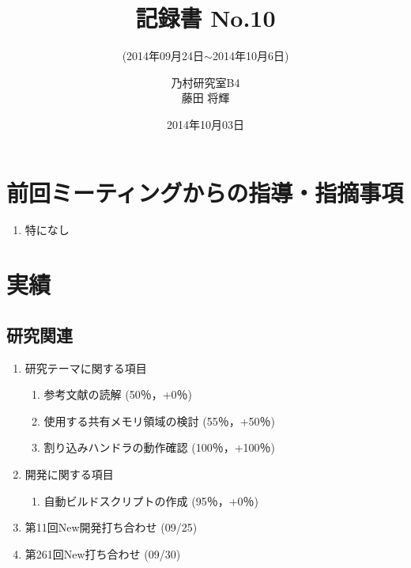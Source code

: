 \documentclass[fleqn, 14pt]{extarticle}
\subtitle{(2014年09月24日$\sim$2014年10月6日)}
\author{乃村研究室B4\\藤田 将輝}
\date{2014年10月03日}
\title{記録書 No.10}
\begin{document}
\maketitle




\section{前回ミーティングからの指導・指摘事項}
\label{sec-1}
\begin{enumerate}
\item 特になし
\newline
\hfill

\end{enumerate}




\section{実績}
\label{sec-2}

\subsection{研究関連}
\label{sec-2-1}
\begin{enumerate}
\item 研究テーマに関する項目
\hfill
\label{enum-research1}
\begin{enumerate}

\item 参考文献の読解
\hfill
\label{enum-1-A}
(50％，+0％)
\item 使用する共有メモリ領域の検討
\hfill
\label{enum-1-B}
(55％，+50％)
\item 割り込みハンドラの動作確認
\hfill
\label{enum-1-C}
(100％，+100％)
\end{enumerate}
\item 開発に関する項目
\hfill
\label{enum-research2}
\begin{enumerate}

\item 自動ビルドスクリプトの作成
\hfill
\label{enum-2-A}
(95％，+0％)
\end{enumerate}

\item 第11回New開発打ち合わせ
\hfill
\label{enum-3}
(09/25)
\item 第261回New打ち合わせ
\hfill
\label{enum-4}
(09/30)



\end{enumerate}
\end{document}
